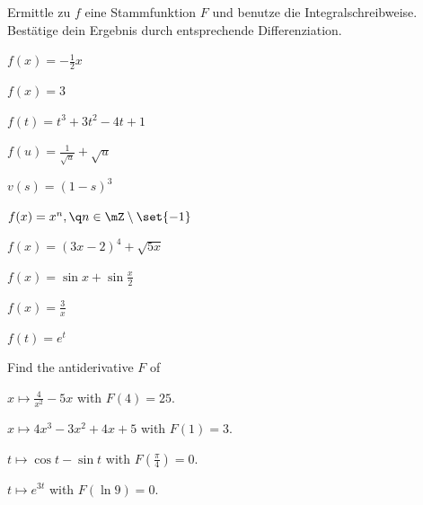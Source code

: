 \documentclass[%
11pt,%
twoside,%
titlepage,%
german,%
headsepline%
]{scrartcl}
\begin{document}
\begin{ueb}[Stammfunktion]
Ermittle zu $f$ eine Stammfunktion $F$ und benutze die Integralschreibweise. Bestätige dein Ergebnis durch entsprechende Differenziation.

\begin{minipage}{0.5\textwidth}
\begin{enumeratea}
\item $f(x)=-\frac{1}{2}x$
\item $f(x)=3$
\item $f(t)=t^3+3t^2-4t+1$
\item $f(u)=\frac{1}{\sqrt{u}}+\sqrt{u}$
\item $v(s)=(1-s)^3$
\end{enumeratea}
\end{minipage}
\begin{minipage}{0.5\textwidth}
\begin{enumeratea}
\setcounter{enumi}{5}
\item $f(x)=x^n,\q n\in\mZ\setminus\set{-1}$
\item $f(x)=(3x-2)^4+\sqrt{5x}$
\item $f(x)=\sin x+\sin\frac{x}{2}$
\item $f(x)=\frac{3}{x}$
\item $f(t)=e^t$
\end{enumeratea}
\end{minipage}
\end{ueb}

\begin{ueb}[Antiableitung]
Find the antiderivative $F$ of

\begin{minipage}{0.5\textwidth}
\begin{enumeratea}
\item $x\mapsto\frac{4}{x^2}-5x$ with $F(4)=25$.
\item $x\mapsto4x^3-3x^2+4x+5$ with $F(1)=3$.
\end{enumeratea}
\end{minipage}
\begin{minipage}{0.5\textwidth}
\begin{enumeratea}
\setcounter{enumi}{2}
\item $t\mapsto\cos t-\sin t$ with $F(\frac{\pi}{4})=0$.
\item $t\mapsto e^{3t}$ with $F(\ln 9)=0$.
\end{enumeratea}
\end{minipage}
\end{ueb}
\end{document}
